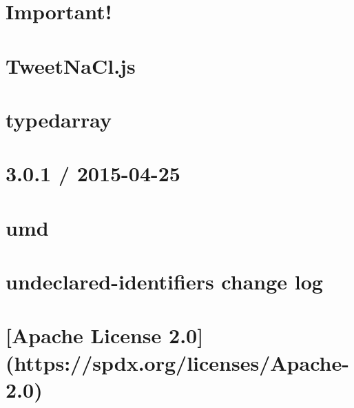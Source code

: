 \documentclass[twoside]{book}
\newcommand{\+}{\discretionary{\mbox{\scriptsize$\hookleftarrow$}}{}{}}
\begin{document}
\chapter{Important!}
\label{md_dsmacc_examples_DRmerge_node_modules_tweetnacl_PULL_REQUEST_TEMPLATE}

\chapter{Tweet\+Na\+Cl.\+js}
\label{md_dsmacc_examples_DRmerge_node_modules_tweetnacl_README}

\chapter{typedarray}
\label{md_dsmacc_examples_DRmerge_node_modules_typedarray_readme}

\chapter{3.0.1 / 2015-\/04-\/25}
\label{md_dsmacc_examples_DRmerge_node_modules_umd_HISTORY}

\chapter{umd}
\label{md_dsmacc_examples_DRmerge_node_modules_umd_README}

\chapter{undeclared-\/identifiers change log}
\label{md_dsmacc_examples_DRmerge_node_modules_undeclared-identifiers_CHANGELOG}

\chapter{\mbox{[}Apache License 2.0\mbox{]}(https\+://spdx.org/licenses/\+Apache-\/2.0)}
\label{md_dsmacc_examples_DRmerge_node_modules_undeclared-identifiers_LICENSE}

\end{document}
